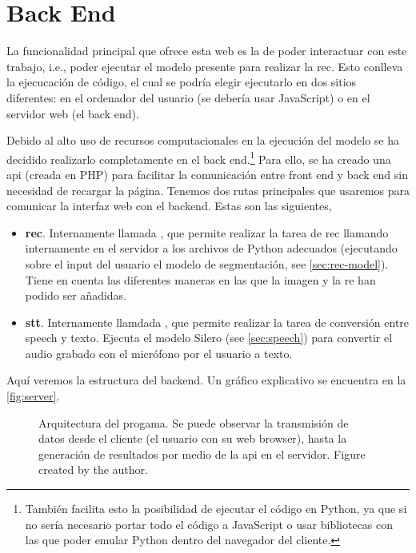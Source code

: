\section{Back End}\label{sec:backend}

La funcionalidad principal que ofrece esta web es la de poder interactuar con
este trabajo, i.e., poder ejecutar el modelo presente para realizar la
\gls{rec}. Esto conlleva la ejecucación de código, el cual se podría elegir
ejecutarlo en dos sitios diferentes: en el ordenador del usuario (se debería
usar JavaScript) o en el servidor web (el back end).

Debido al alto uso de recursos computacionales en la ejecución del modelo se ha
decidido realizarlo completamente en el back end.\footnote{También facilita
  esto la posibilidad de ejecutar el código en Python, ya que si no sería
  necesario portar todo el código a JavaScript o usar bibliotecas con las que
  poder emular Python dentro del navegador del cliente.} Para ello, se ha
creado una \gls{api} (creada en PHP) para facilitar la comunicación entre front
end y back end sin necesidad de recargar la página. Tenemos dos rutas
principales que usaremos para comunicar la interfaz web con el backend. Estas
son las siguientes,
\begin{itemize}
  \item \textbf{\gls*{rec}}. Internamente llamada ,
  que permite realizar la tarea de \gls{rec} llamando internamente en el
  servidor a los archivos de Python adecuados (ejecutando sobre el input del
  usuario el modelo de segmentación, see \vref{sec:rec-model}). Tiene en cuenta
  las diferentes maneras en las que la imagen y la \gls{re} han podido ser
  añadidas.
  \item \textbf{\gls*{stt}}. Internamente llamdada , que
  permite realizar la tarea de conversión entre speech y texto. Ejecuta el
  modelo Silero (see \vref{sec:speech}) para convertir el audio grabado con el
  micrófono por el usuario a texto.
\end{itemize}


Aquí veremos la estructura del backend. Un gráfico explicativo se encuentra en
la \vref{fig:server}.

\begin{figure}[p]
  \centering
  \resizebox{\textwidth}{!}{}
  \caption[Arquitectura del programa]{Arquitectura del progama. Se puede
    observar la transmisión de datos desde el cliente (el usuario con su web
    browser), hasta la generación de resultados por medio de la \gls{api} en el
    servidor. Figure created by the author.}\label{fig:server}
\end{figure}
